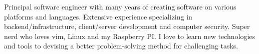 

\begin{cvparagraph}

Principal software engineer with many years of creating software on various platforms and languages. Extensive experience specializing in backend/infrastructure, client/server development and computer security. Super nerd who loves vim, Linux and my Raspberry PI. I love to learn new technologies and tools to devising a better problem-solving method for challenging tasks.
\end{cvparagraph}
